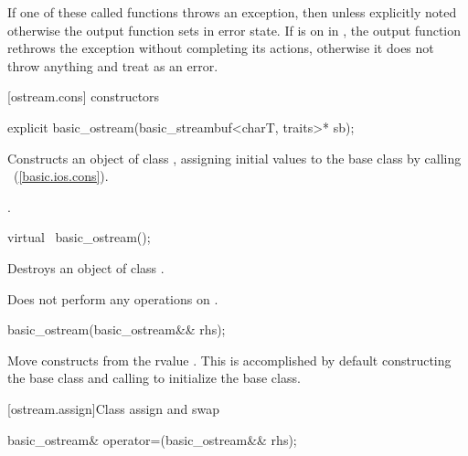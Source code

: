 \pnum
If one of these called functions throws an exception, then unless explicitly noted otherwise
the output function sets
in error state.
If
is on in
,
the output function
rethrows the exception without completing its actions, otherwise
it does not throw anything and treat as an error.

[ostream.cons]{ constructors}

%
\begin{itemdecl}
explicit basic_ostream(basic_streambuf<charT, traits>* sb);
\end{itemdecl}

%
\begin{itemdescr}
\pnum
\effects
Constructs an object of class
,
assigning initial values to the base class by calling
~(\ref{basic.ios.cons}).

\pnum
\postcondition
{}.

%
\begin{itemdecl}
virtual ~basic_ostream();
\end{itemdecl}

\pnum
\effects
Destroys an object of class
.

\pnum
\remarks
Does not perform any operations on
.
\end{itemdescr}

%
\begin{itemdecl}
basic_ostream(basic_ostream&& rhs);
\end{itemdecl}

\begin{itemdescr}
\pnum
\effects Move constructs from the rvalue .
This is accomplished by default constructing the base class and calling
 to initialize the
base class.
\end{itemdescr}

[ostream.assign]{Class  assign and swap}

%
%
\begin{itemdecl}
basic_ostream& operator=(basic_ostream&& rhs);
\end{itemdecl}

